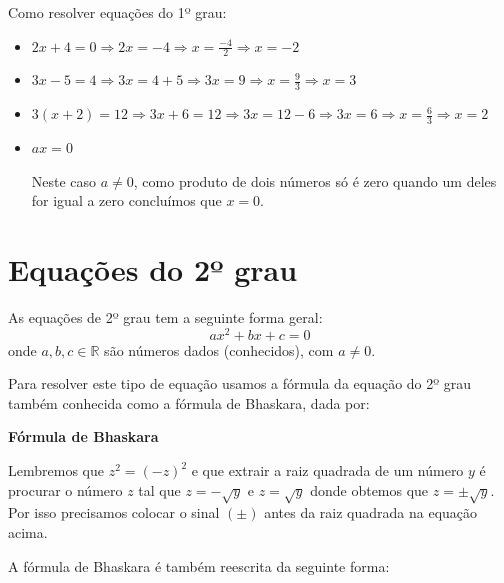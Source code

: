 \begin{exem}
 Como resolver equações do 1º grau:
 \begin{itemize}
  \item $2x + 4 = 0 \Rightarrow 2x = -4 \Rightarrow x = \frac{-4}{2} \Rightarrow x = -2$
  \item $3x - 5 = 4 \Rightarrow 3x = 4 +5 \Rightarrow 3x = 9 \Rightarrow x = \frac{9}{3} \Rightarrow x = 3$
  \item $3(x + 2)= 12 \Rightarrow 3x + 6 = 12 \Rightarrow 3x = 12 - 6 \Rightarrow 3x = 6 \Rightarrow x = \frac{6}{3} \Rightarrow x = 2 $
  \item $ax = 0$

  Neste caso $a \neq 0$, como produto de dois números só é zero quando um deles for igual a zero concluímos que $x = 0$.
  \end{itemize}
\end{exem}

\newpage
\section{Equações do 2º grau}

\colorbox{azul}{
 \begin{minipage}{0.9\linewidth}
 \begin{center}
   As equações de 2º grau tem a seguinte forma geral:
\begin{equation}
ax^2 + bx + c = 0
\end{equation}
  onde $a, b, c \in \mathbb{R}$ são números dados (conhecidos), com $a \neq 0 $.
 \end{center}
 \end{minipage}}

 \vskip0.3cm

Para resolver este tipo de equação usamos a fórmula da equação do 2º grau também conhecida como a fórmula de Bhaskara, dada por:

 \vskip0.3cm
 \begin{center}
 \textbf{Fórmula de Bhaskara}
 \end{center}

Lembremos que $z^2= (-z)^2$ e que extrair a raiz quadrada de um número $y$ é procurar o número $z$ tal que $z= -\sqrt{y}$ e $z= \sqrt{y}$ donde obtemos que $z= \pm \sqrt{y}$. Por isso precisamos colocar o sinal $(\pm)$ antes da raiz quadrada na equação acima.

A fórmula de Bhaskara é também reescrita da seguinte forma:

